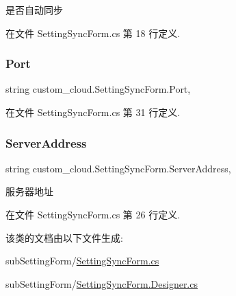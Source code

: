 是否自动同步 



在文件 Setting\+Sync\+Form.\+cs 第 18 行定义.

\mbox{\label{classcustom__cloud_1_1_setting_sync_form_a3820352141ce5448660dde19a32e132a}} 
\subsubsection{\texorpdfstring{Port}{Port}}
{\footnotesize\ttfamily string custom\+\_\+cloud.\+Setting\+Sync\+Form.\+Port\hspace{0.3cm}{\ttfamily [get]}, {\ttfamily [set]}}



在文件 Setting\+Sync\+Form.\+cs 第 31 行定义.

\mbox{\label{classcustom__cloud_1_1_setting_sync_form_a42d4a867b5073ec8c0e1259412989c10}} 
\subsubsection{\texorpdfstring{Server\+Address}{ServerAddress}}
{\footnotesize\ttfamily string custom\+\_\+cloud.\+Setting\+Sync\+Form.\+Server\+Address\hspace{0.3cm}{\ttfamily [get]}, {\ttfamily [set]}}



服务器地址 



在文件 Setting\+Sync\+Form.\+cs 第 26 行定义.



该类的文档由以下文件生成\+:\begin{DoxyCompactItemize}
\item 
sub\+Setting\+Form/\hyperlink{_setting_sync_form_8cs}{Setting\+Sync\+Form.\+cs}\item 
sub\+Setting\+Form/\hyperlink{_setting_sync_form_8_designer_8cs}{Setting\+Sync\+Form.\+Designer.\+cs}\end{DoxyCompactItemize}
